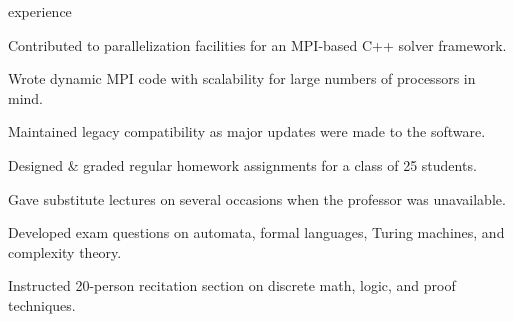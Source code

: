 \documentclass{cv}
\begin{document}

\begin{cvsection}{experience}
  {
    \item Contributed to parallelization facilities for an MPI-based C++ solver framework.
    \item Wrote dynamic MPI code with scalability for large numbers of processors in mind.
    \item Maintained legacy compatibility as major updates were made to the software.
  }
  {
    \item Designed \& graded regular homework assignments for a class of 25 students.
    \item Gave substitute lectures on several occasions when the professor was unavailable.
    \item Developed exam questions on automata, formal languages, Turing machines, and complexity theory.
  }
  {
    \item Instructed 20-person recitation section on discrete math, logic, and proof techniques.
  }
\end{cvsection}
\end{document}
